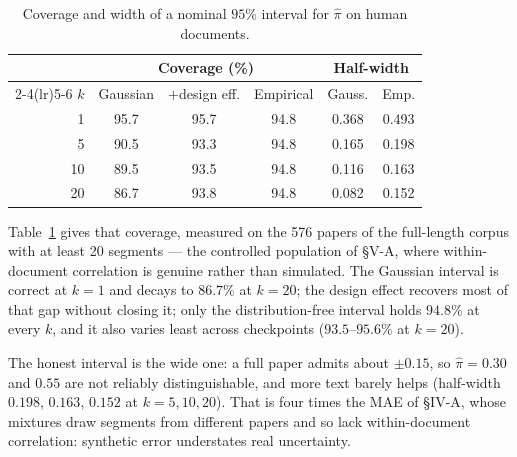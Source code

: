 \documentclass[10pt,conference,a4paper]{IEEEtran}
\newcommand{\sect}[1]{\S#1}
\begin{document}
\begin{table}[t]
\caption{Coverage and width of a nominal $95\%$ interval for $\hat{\pi}$ on human
documents.}
\label{tab:pici}
\centering
\scriptsize
\setlength{\tabcolsep}{3pt}
\begin{tabular}{@{}rccccc@{}}
\toprule
& \multicolumn{3}{c}{Coverage (\%)} & \multicolumn{2}{c}{Half-width} \\
\cmidrule(lr){2-4}\cmidrule(lr){5-6}
$k$ & Gaussian & $+$design eff. & Empirical & Gauss. & Emp. \\
\midrule
1  & 95.7 & 95.7 & 94.8 & 0.368 & 0.493 \\
5  & 90.5 & 93.3 & 94.8 & 0.165 & 0.198 \\
10 & 89.5 & 93.5 & 94.8 & 0.116 & 0.163 \\
20 & 86.7 & 93.8 & 94.8 & 0.082 & 0.152 \\
\bottomrule
\end{tabular}
\end{table}

Table~\ref{tab:pici} gives that coverage, measured on the 576 papers of the full-length corpus with
at least 20 segments --- the controlled population of \sect{V-A}, where within-document
correlation is genuine rather than simulated. The Gaussian interval is correct at
$k{=}1$ and decays to $86.7\%$ at $k{=}20$; the design effect recovers most of that gap
without closing it; only the distribution-free interval holds $94.8\%$ at every $k$,
and it also varies least across checkpoints ($93.5$--$95.6\%$ at $k{=}20$).

The honest interval is the wide one: a full paper admits about $\pm0.15$, so
$\hat{\pi}=0.30$ and $0.55$ are not reliably distinguishable, and more text barely helps
(half-width $0.198$, $0.163$, $0.152$ at $k{=}5,10,20$). That is four times the MAE of
\sect{IV-A}, whose mixtures draw segments from different papers and so lack
within-document correlation: synthetic error understates real uncertainty.

\end{document}
